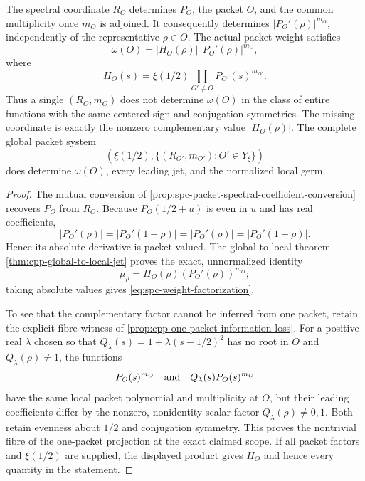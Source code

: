 \begin{proposition}
\label{prop:spc-jet-weight-information}
The spectral coordinate \(R_O\) determines \(P_O\), the packet \(O\), and
the common multiplicity once \(m_O\) is adjoined.  It consequently determines
\(|P_O'(\rho)|^{m_O}\), independently of the representative
\(\rho\in O\).  The actual packet weight satisfies
\begin{equation}
\label{eq:spc-weight-factorization}
 \omega(O)
 =
 |H_O(\rho)|\,|P_O'(\rho)|^{m_O},
\end{equation}
where
\[
 H_O(s)=\xi(1/2)
 \prod_{O'\ne O}P_{O'}(s)^{m_{O'}}.
\]
Thus a single \((R_O,m_O)\) does not determine \(\omega(O)\) in the class of
entire functions with the same centered sign and conjugation symmetries.  The
missing coordinate is exactly the nonzero complementary value
\(|H_O(\rho)|\).  The complete global packet system
\[
 \left(\xi(1/2),\{(R_{O'},m_{O'}):O'\in Y_\xi\}\right)
\]
does determine \(\omega(O)\), every leading jet, and the normalized local
germ.
\end{proposition}

\begin{proof}
The mutual conversion of \cref{prop:spc-packet-spectral-coefficient-conversion}
recovers \(P_O\) from \(R_O\).  Because
\(P_O(1/2+u)\) is even in \(u\) and has real coefficients,
\[
 |P_O'(\rho)|
 =|P_O'(1-\rho)|
 =|P_O'(\overline\rho)|
 =|P_O'(1-\overline\rho)|.
\]
Hence its absolute derivative is packet-valued.  The global-to-local theorem
\cref{thm:cpp-global-to-local-jet} proves the exact, unnormalized identity
\[
 \mu_\rho=H_O(\rho)(P_O'(\rho))^{m_O};
\]
taking absolute values gives \eqref{eq:spc-weight-factorization}.

To see that the complementary factor cannot be inferred from one packet,
retain the explicit fibre witness of
\cref{prop:cpp-one-packet-information-loss}.  For a positive real
\(\lambda\) chosen so that
\(Q_\lambda(s)=1+\lambda(s-1/2)^2\) has no root in \(O\) and
\(Q_\lambda(\rho)\ne1\), the functions
\[
 P_O(s)^{m_O}
 \quad\hbox{and}\quad
 Q_\lambda(s)P_O(s)^{m_O}
\]
  have the same local packet polynomial and multiplicity at \(O\), but their
  leading coefficients differ by the nonzero, nonidentity scalar factor
  \(Q_\lambda(\rho)\ne0,1\).
Both retain evenness about \(1/2\) and conjugation symmetry.  This proves the
nontrivial fibre of the one-packet projection at the exact claimed scope.  If
all packet factors and \(\xi(1/2)\) are supplied, the displayed product gives
\(H_O\) and hence every quantity in the statement.
\end{proof}

